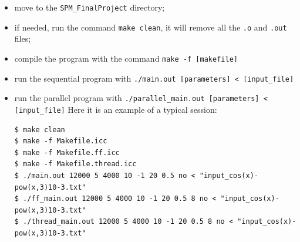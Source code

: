 \documentclass[10pt]{article}
\numberwithin{equation}{section}
\begin{document}
\begin{itemize}
\item move to the \verb|SPM_FinalProject| directory;
\item if needed, run the command \verb|make clean|, it will remove all the \verb|.o| and \verb|.out| files; 
\item compile the program with the command \verb|make -f [makefile]|
\item run the sequential program with \verb|./main.out [parameters] < [input_file]|
\item run the parallel program with \verb|./parallel_main.out [parameters] < [input_file]|
Here it is an example of a typical session:
\begin{verbatim}
$ make clean
$ make -f Makefile.icc
$ make -f Makefile.ff.icc
$ make -f Makefile.thread.icc
$ ./main.out 12000 5 4000 10 -1 20 0.5 no < "input_cos(x)-pow(x,3)10-3.txt"
$ ./ff_main.out 12000 5 4000 10 -1 20 0.5 8 no < "input_cos(x)-pow(x,3)10-3.txt"
$ ./thread_main.out 12000 5 4000 10 -1 20 0.5 8 no < "input_cos(x)-pow(x,3)10-3.txt"
\end{verbatim}

\end{itemize}
\end{document}
